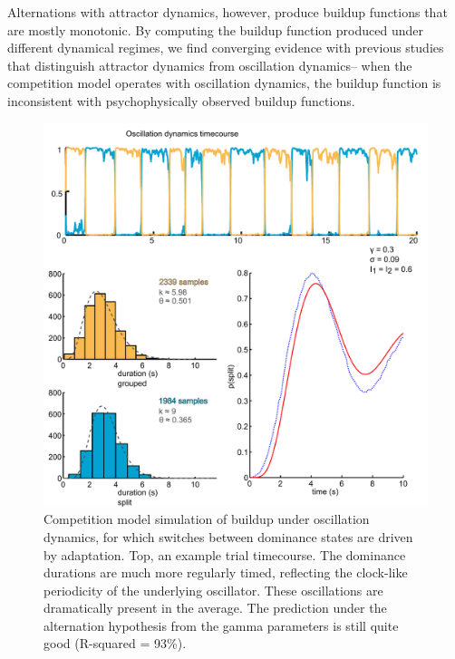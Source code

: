 \documentclass[10pt]{article}
\begin{document}
Alternations with attractor dynamics, however, produce buildup functions that are mostly monotonic. By computing the buildup function produced under different dynamical regimes, we find converging evidence with previous studies that distinguish attractor dynamics from oscillation dynamics-- when the competition model operates with oscillation dynamics, the buildup function is inconsistent with psychophysically observed buildup functions. 

\begin{figure}
		\centering
		
		\includegraphics[scale=.45]{hi_adapt_low_noise_equal_inputBUFsHists}
				
		
		\caption{Competition model simulation of buildup under oscillation dynamics, for which switches between dominance states are driven by adaptation. Top, an example trial timecourse. The dominance durations are much more regularly timed, reflecting the clock-like periodicity of the underlying oscillator. These oscillations are dramatically present in the average. The prediction under the alternation hypothesis from the gamma parameters is still quite good (R-squared = 93\%).}
		\label{oscillation_dynamic_buildup}
\end{figure}
		

\end{document}
